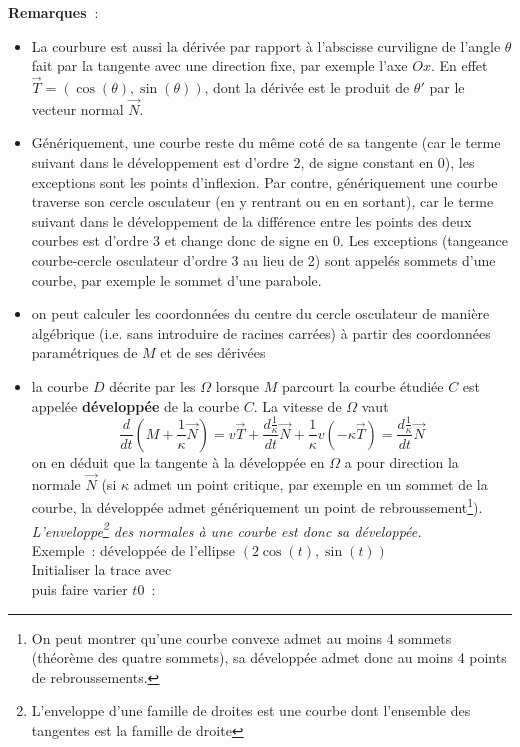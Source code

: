 \documentclass[a4paper,11pt]{article}
\begin{document}
\begin{giacjshere}
{\bf Remarques~}: 
\begin{itemize}
\item La courbure est aussi la d\'eriv\'ee par
rapport \`a l'abscisse curviligne de 
l'angle $\theta$ fait par la
  tangente avec une direction fixe, par exemple l'axe $Ox$.
En effet $\vec{T}=(\cos(\theta),\sin(\theta))$,
dont la d\'eriv\'ee est le produit de $\theta'$ par le vecteur
normal $\vec{N}$.
\item G\'en\'eriquement, une courbe reste du m\^eme cot\'e de
sa tangente (car le terme suivant dans le d\'eveloppement est d'ordre
2, de signe constant en 0), les exceptions sont les points
d'inflexion. Par contre,
g\'en\'eriquement une courbe traverse son cercle osculateur (en y
rentrant ou en en sortant), car le terme suivant dans le
d\'eveloppement de la diff\'erence entre les points des deux courbes 
est d'ordre 3 et change donc de signe en 0. Les exceptions
(tangeance courbe-cercle osculateur d'ordre 3 au lieu de 2)
sont appel\'es sommets d'une courbe, par exemple le sommet d'une
parabole.
\item on peut calculer les coordonn\'ees du centre du cercle
osculateur de mani\`ere alg\'ebrique (i.e. sans introduire de racines
carr\'ees) \`a partir des
coordonn\'ees param\'etriques de $M$ et de ses d\'eriv\'ees
\item la courbe $D$ d\'ecrite par les $\Omega$ lorsque $M$ parcourt
la courbe \'etudi\'ee $C$ est appel\'ee
{\bf d\'evelopp\'ee} 
de la courbe $C$. 
La vitesse de $\Omega$ vaut
$$ \frac{d}{dt}(M+\frac1\kappa \vec{N})=v\vec{T} +
\frac{d\frac1\kappa}{dt} \vec{N} + \frac1\kappa v(-\kappa
\vec{T})
= \frac{d\frac1\kappa}{dt} \vec{N} $$
on en d\'eduit que la tangente \`a la d\'evelopp\'ee en $\Omega$ a
pour direction la normale $\vec{N}$  (si $\kappa$ admet un
point critique, par exemple en un sommet de la courbe,
la d\'evelopp\'ee admet g\'en\'eriquement
un point de rebroussement\footnote{On peut montrer qu'une courbe
convexe admet au moins 4 sommets (th\'eor\`eme des quatre sommets), 
sa d\'evelopp\'ee admet donc
au moins 4 points de rebroussements.}). 
{\em L'enveloppe\footnote{L'enveloppe d'une famille
de droites est une courbe dont l'ensemble des tangentes est la famille de droite} 
des normales \`a une courbe est donc sa d\'evelopp\'ee.}\\
Exemple~: d\'evelopp\'ee de l'ellipse $(2\cos(t),\sin(t))$\\
Initialiser la trace avec \\
puis faire varier $t0$~:

\end{itemize}
\end{giacjshere}
\end{document}
